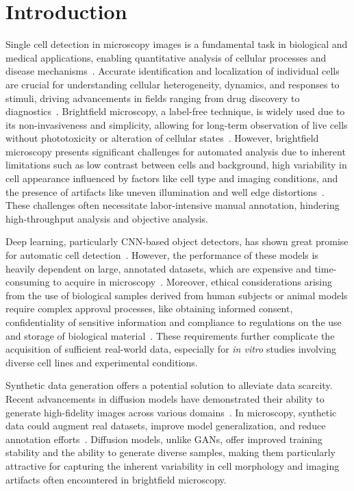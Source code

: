 \section{Introduction}
\label{sec:introduction}
Single cell detection in microscopy images is a fundamental task in biological and medical applications, enabling quantitative analysis of cellular processes and disease mechanisms~\cite{meijering_cell_2012}.
Accurate identification and localization of individual cells are crucial for understanding cellular heterogeneity, dynamics, and responses to stimuli, driving advancements in fields ranging from drug discovery to diagnostics~\cite{f_mualla_automatic_2016,e_d_ferreira_classification_2024}.
Brightfield microscopy, a label-free technique, is widely used due to its non-invasiveness and simplicity, allowing for long-term observation of live cells without phototoxicity or alteration of cellular states~\cite{jyrki_selinummi_bright_2009,huixia_ren_cellbow_2020}.
However, brightfield microscopy presents significant challenges for automated analysis due to inherent limitations such as low contrast between cells and background, high variability in cell appearance influenced by factors like cell type and imaging conditions, and the presence of artifacts like uneven illumination and well edge distortions~\cite{jyrki_selinummi_bright_2009,f_mualla_automatic_2016}.
These challenges often necessitate labor-intensive manual annotation, hindering high-throughput analysis and objective analysis.

Deep learning, particularly CNN-based object detectors, has shown great promise for automatic cell detection~\cite{erick_moen_deep_2019,thorsten_falk_u-net_2019}.
However, the performance of these models is heavily dependent on large, annotated datasets, which are expensive and time-consuming to acquire in microscopy~\cite{ronneberger_u-net_2015}.
Moreover, ethical considerations arising from the use of biological samples derived from human subjects or animal models require complex approval processes, like obtaining informed consent, confidentiality of sensitive information and compliance to regulations on the use and storage of biological material~\cite{anne_cambonthomsen_series_2007,i_galende_ethical_2023,gregory_pappas_exploring_2005}.
These requirements further complicate the acquisition of sufficient real-world data, especially for \textit{in vitro} studies involving diverse cell lines and experimental conditions.

Synthetic data generation offers a potential solution to alleviate data scarcity.
Recent advancements in diffusion models have demonstrated their ability to generate high-fidelity images across various domains~\cite{ho_denoising_2020,song_denoising_2020}.
In microscopy, synthetic data could augment real datasets, improve model generalization, and reduce annotation efforts~\cite{rajaram_simucell_2012,trampert_deep_2021,lehmussola_synthetic_2008}.
Diffusion models, unlike GANs, offer improved training stability and the ability to generate diverse samples, making them particularly attractive for capturing the inherent variability in cell morphology and imaging artifacts often encountered in brightfield microscopy.

